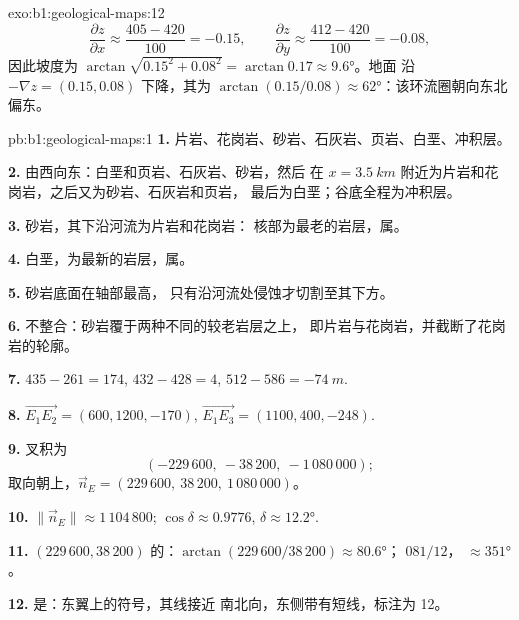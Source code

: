 \begin{solution}{exo:b1:geological-maps:12}
\[
  \frac{\partial z}{\partial x} \approx \frac{405 - 420}{100} = -0.15, \qquad
  \frac{\partial z}{\partial y} \approx \frac{412 - 420}{100} = -0.08,
\]
因此坡度为 $\arctan\sqrt{0.15^2 + 0.08^2} = \arctan 0.17 \approx
\ang{9.6}$。地面
沿 $-\nabla z = (0.15, 0.08)$ 下降，其为
$\arctan(0.15/0.08) \approx \ang{62}$：该环流圈朝向东北偏东。
\end{solution}

\begin{solution}{pb:b1:geological-maps:1}
\textbf{1.} 片岩、花岗岩、砂岩、石灰岩、页岩、白垩、冲积层。

\textbf{2.} 由西向东：白垩和页岩、石灰岩、砂岩，然后
在 $x = \qty{3.5}{km}$ 附近为片岩和花岗岩，之后又为砂岩、石灰岩和页岩，
最后为白垩；谷底全程为冲积层。

\textbf{3.} 砂岩，其下沿河流为片岩和花岗岩：
核部为最老的岩层，属。

\textbf{4.} 白垩，为最新的岩层，属。

\textbf{5.} 砂岩底面在轴部最高，
只有沿河流处侵蚀才切割至其下方。

\textbf{6.} 不整合：砂岩覆于两种不同的较老岩层之上，
即片岩与花岗岩，并截断了花岗岩的轮廓。

\textbf{7.} $435 - 261 = 174$, $432 - 428 = 4$, $512 - 586 = \qty{-74}{m}$.

\textbf{8.} $\overrightarrow{E_1E_2} = (600, 1200, -170)$,
$\overrightarrow{E_1E_3} = (1100, 400, -248)$.

\textbf{9.} 叉积为
\[
  (-229\,600,\ -38\,200,\ -1\,080\,000);
\]
取向朝上，$\vec n_E = (229\,600,\ 38\,200,\ 1\,080\,000)$。

\textbf{10.} $\|\vec n_E\| \approx 1\,104\,800$; $\cos\delta \approx 0.9776$,
$\delta \approx \ang{12.2}$.

\textbf{11.} $(229\,600, 38\,200)$ 的：$\arctan(229\,600/38\,200)
\approx \ang{80.6}$； $081/12$， $\approx \ang{351}$。

\textbf{12.} 是：东翼上的符号，其线接近
南北向，东侧带有短线，标注为 12。


\end{solution}

